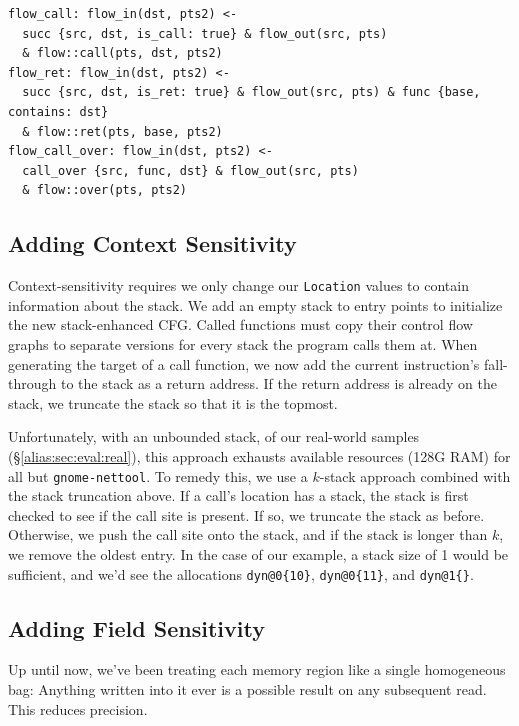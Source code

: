 \begin{lstlisting}[float=*t, caption={Inter-procedural Rules}, label=lst:interrules]
flow_call: flow_in(dst, pts2) <-
  succ {src, dst, is_call: true} & flow_out(src, pts)
  & flow::call(pts, dst, pts2)
flow_ret: flow_in(dst, pts2) <-
  succ {src, dst, is_ret: true} & flow_out(src, pts) & func {base, contains: dst}
  & flow::ret(pts, base, pts2)
flow_call_over: flow_in(dst, pts2) <-
  call_over {src, func, dst} & flow_out(src, pts)
  & flow::over(pts, pts2)
\end{lstlisting}





\subsection{Adding Context Sensitivity}
Context-sensitivity requires we only change our \texttt{Location}
values to contain information about the stack.
We add an empty stack to entry points to initialize the new stack-enhanced CFG.
Called functions must copy their control flow graphs to separate versions for every stack the program calls them at.
When generating the target of a call function, we now add the current instruction's fall-through to the stack as a return address.
If the return address is already on the stack, we truncate the stack so that it is the topmost.

Unfortunately, with an unbounded stack, of our real-world samples (\S \ref{alias:sec:eval:real}), this approach exhausts available resources (128G RAM) for all but \texttt{gnome-nettool}.
To remedy this, we use a $k$-stack approach combined with the stack truncation above.
If a call's location has a stack, the stack is first checked to see if the call site is present.
If so, we truncate the stack as before.
Otherwise, we push the call site onto the stack, and if the stack is longer than $k$, we remove the oldest entry.
In the case of our example, a stack size of 1 would be sufficient, and we'd see the allocations \texttt{dyn@0\{10\}}, \texttt{dyn@0\{11\}}, and \texttt{dyn@1\{\}}.

\subsection{Adding Field Sensitivity}
\label{sec:field}
Up until now, we've been treating each memory region like a single homogeneous bag:
Anything written into it ever is a possible result on any subsequent read.
This reduces precision.

